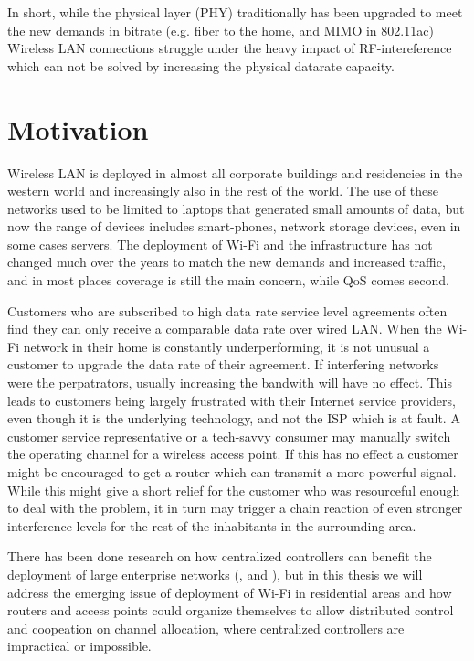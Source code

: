In short, while the physical layer (PHY) traditionally has been upgraded to meet the new demands in bitrate (e.g. fiber to the home, 
and MIMO in 802.11ac) Wireless LAN connections struggle under the heavy impact of RF-intereference which can not be solved by increasing
the physical datarate capacity. 

\section{Motivation}
Wireless LAN is deployed in almost all corporate buildings and residencies in the western world and increasingly also in the rest of the world.
The use of these networks used to be limited to laptops that generated small amounts of data, but now the range of devices includes
smart-phones, network storage devices, even in some cases servers. The deployment of Wi-Fi and the infrastructure has not 
changed much over the years to match the new demands and increased traffic, and in most places coverage is still the main concern, while
QoS comes second. 

Customers who are subscribed to high data rate service level agreements often find they can only receive a comparable data rate over wired LAN.
When the Wi-Fi network in their home is constantly underperforming, it is not unusual a customer to upgrade the data rate of their agreement. If interfering networks
were the perpatrators, usually increasing the bandwith will have no effect. This leads to customers being largely frustrated with their Internet service providers,
even though it is the underlying technology, and not the ISP which is at fault. A customer service representative or a tech-savvy consumer may manually
switch the operating channel for a wireless access point. If this has no effect a customer might be encouraged to get a router which can transmit a more powerful signal.
While this might give a short relief for the customer who was resourceful enough to deal with the problem, it in turn may trigger a chain reaction of even stronger
interference levels for the rest of the inhabitants in the surrounding area. 

There has been done research on how centralized controllers can benefit the deployment
of large enterprise networks (\cite{Murty}, \cite{Murty2} and \cite{Suresh}), but in this thesis we will address the emerging issue of deployment of Wi-Fi
in residential areas and how routers and access points could organize themselves to allow distributed control and coopeation on channel allocation, where centralized controllers
are impractical or impossible.

